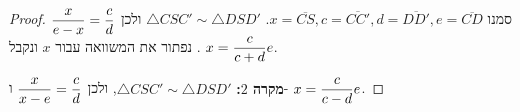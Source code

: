 \begin{proof}

סמנו
$x = \overline{CS}, c = \overline{CC'}, d = \overline{DD'}, e = \overline{CD}$.
$\triangle CSC'\sim\triangle DSD'$
ולכן
$\displaystyle\frac{x}{e-x} = \displaystyle\frac{c}{d}$.
נפתור את המשוואה עבור
$x$
ונקבל
$x=\displaystyle\frac{c}{c+d}e$.

\textbf{מקרה $2$:}
$\triangle CSC'\sim\triangle DSD'$,
ולכן
$\displaystyle\frac{x}{x-e}=\displaystyle\frac{c}{d}$
ו-%
$x=\displaystyle\frac{c}{c-d}e$.


\end{proof}
